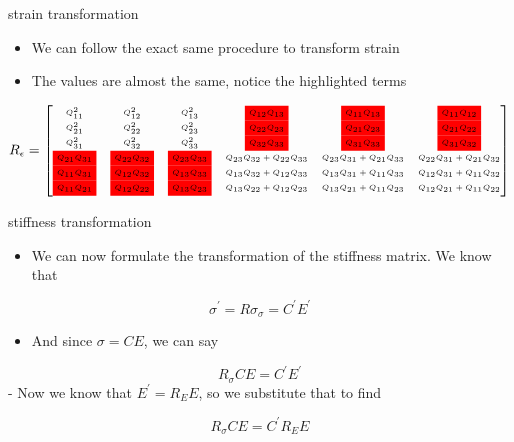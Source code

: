 \documentclass[
  letterpaper,
  ignorenonframetext,
  aspectratio=43,
  handout,
  12pt]{beamer}
\providecommand{\tightlist}{%
  \setlength{\itemsep}{0pt}\setlength{\parskip}{0pt}}
\providecommand{\tightlist}{%
\setlength{\itemsep}{0pt}\setlength{\parskip}{0pt}}
\begin{document}
\begin{frame}{strain transformation}
\protect\hypertarget{strain-transformation}{}
\begin{itemize}
\tightlist
\item
  We can follow the exact same procedure to transform strain
\item
  The values are almost the same, notice the highlighted terms
\end{itemize}

\[ \tiny{R_\epsilon = \begin{bmatrix}
    Q_{11}^2 & Q_{12}^2 & Q_{13}^2 & {    \colorbox{red}{$ Q_{12}Q_{13} $}} &  {    \colorbox{red}{$ Q_{11} Q_{13} $}} & {    \colorbox{red}{$ Q_{11}Q_{12} $}}\\
    Q_{21}^2 & Q_{22}^2 & Q_{23}^2 & {    \colorbox{red}{$ Q_{22}Q_{23} $}} &  {    \colorbox{red}{$ Q_{21} Q_{23} $}} & {    \colorbox{red}{$ Q_{21}Q_{22} $}}\\
    Q_{31}^2 & Q_{32}^2 & Q_{33}^2 & {    \colorbox{red}{$ Q_{32}Q_{33} $}} &  {    \colorbox{red}{$ Q_{31} Q_{33} $}} & {    \colorbox{red}{$ Q_{31}Q_{32} $}}\\
    {    \colorbox{red}{$ Q_{21}Q_{31} $}} & {    \colorbox{red}{$ Q_{22}Q_{32} $}} & {    \colorbox{red}{$ Q_{23}Q_{33} $}} & Q_{23}Q_{32} + Q_{22}Q_{33} & Q_{23}Q_{31} + Q_{21}Q_{33} & Q_{22}Q_{31} + Q_{21}Q_{32}\\
    {    \colorbox{red}{$ Q_{11}Q_{31} $}} & {    \colorbox{red}{$ Q_{12}Q_{32} $}} & {    \colorbox{red}{$ Q_{13}Q_{33} $}} & Q_{13}Q_{32} + Q_{12}Q_{33} & Q_{13}Q_{31} + Q_{11}Q_{33} & Q_{12}Q_{31} + Q_{11}Q_{32}\\
    {    \colorbox{red}{$ Q_{11}Q_{21} $}} & {    \colorbox{red}{$ Q_{12}Q_{22} $}} & {    \colorbox{red}{$ Q_{13}Q_{23} $}} & Q_{13}Q_{22} + Q_{12}Q_{23} & Q_{13}Q_{21} + Q_{11}Q_{23} & Q_{12}Q_{21} + Q_{11}Q_{22}
\end{bmatrix}}\]
\end{frame}

\begin{frame}{stiffness transformation}
\protect\hypertarget{stiffness-transformation}{}
\begin{itemize}
\tightlist
\item
  We can now formulate the transformation of the stiffness matrix. We
  know that
\end{itemize}

\[ \sigma^\prime = R \sigma_\sigma = C^\prime E^\prime\]

\begin{itemize}
\tightlist
\item
  And since \(\sigma=CE\), we can say
\end{itemize}

\[ R_\sigma CE = C^\prime E^\prime\] - Now we know that
\(E^\prime = R_E E\), so we substitute that to find

\[ R_\sigma CE = C^\prime R_E E\]
\end{frame}
\end{document}
